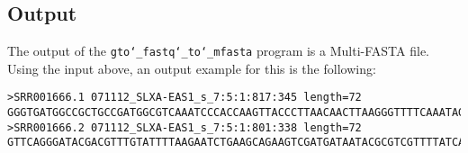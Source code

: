 \subsection*{Output}
The output of the \texttt{gto\char`_fastq\char`_to\char`_mfasta} program is a Multi-FASTA file.\\
Using the input above, an output example for this is the following:
\begin{lstlisting}
>SRR001666.1 071112_SLXA-EAS1_s_7:5:1:817:345 length=72
GGGTGATGGCCGCTGCCGATGGCGTCAAATCCCACCAAGTTACCCTTAACAACTTAAGGGTTTTCAAATAGA
>SRR001666.2 071112_SLXA-EAS1_s_7:5:1:801:338 length=72
GTTCAGGGATACGACGTTTGTATTTTAAGAATCTGAAGCAGAAGTCGATGATAATACGCGTCGTTTTATCAT
\end{lstlisting}
